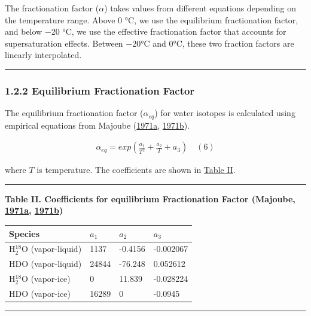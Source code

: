 \documentclass[11pt]{article}
\begin{document}
The fractionation factor (\(\alpha\)) takes values from different equations depending on the
temperature range. Above 0 °C, we use the equilibrium fractionation factor, and below −20 °C, we use
the effective fractionation factor that accounts for supersaturation effects. Between −20°C and 0°C,
these two fraction factors are linearly interpolated.

\begin{center}\rule{0.5\linewidth}{0.5pt}\end{center}

\subsubsection{1.2.2 Equilibrium Fractionation Factor}\label{equilibrium-fractionation-factor}

The equilibrium fractionation factor (\(\alpha_{eq}\)) for water isotopes is calculated using
empirical equations from Majoube (\hyperref[majoube1971a]{1971a}, \hyperref[majoube1971b]{1971b}).

\[
\begin{array}{r}
\alpha_{eq} = exp\left( \frac{a_{1}}{T^{2}} + \frac{a_{2}}{T} + a_{3} \right) \quad (6)
\end{array}
\]

where \(T\) is temperature. The coefficients are shown in \hyperref[Table-II]{Table II}.

\begin{center}\rule{0.5\linewidth}{0.5pt}\end{center}

\textbf{Table II. Coefficients for equilibrium Fractionation Factor (Majoube,
\hyperref[majoube1971a]{1971a}, \hyperref[majoube1971b]{1971b})}

\begin{longtable}[]{@{}llll@{}}
\toprule\noalign{}
Species & \(a_1\) & \(a_2\) & \(a_3\) \\
\midrule\noalign{}
\endhead
\bottomrule\noalign{}
\endlastfoot
H\(_2^{18}\)O (vapor-liquid) & 1137 & -0.4156 & -0.002067 \\
HDO (vapor-liquid) & 24844 & -76.248 & 0.052612 \\
H\(_2^{18}\)O (vapor-ice) & 0 & 11.839 & -0.028224 \\
HDO (vapor-ice) & 16289 & 0 & -0.0945 \\
\end{longtable}

\begin{center}\rule{0.5\linewidth}{0.5pt}\end{center}
\end{document}
